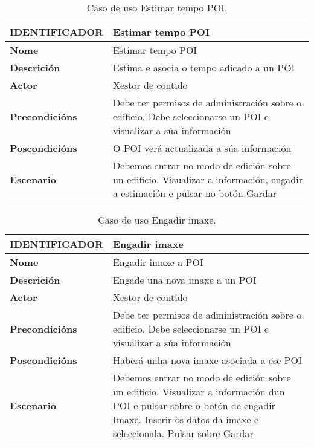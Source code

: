 \begin{table}[tbh]
	\footnotesize
	\centering
	\begin{tabular}{|l|p{10cm}|}
		\hline 
		\textbf{IDENTIFICADOR}	& \textbf{Estimar tempo POI} \\ 
		\hline 
		\textbf{Nome} & Estimar tempo POI \\ 
		\hline 
		\textbf{Descrición} & Estima e asocia o tempo adicado a un POI \\ 
		\hline 
		\textbf{Actor} & Xestor de contido \\ 
		\hline 
		\textbf{Precondicións} & Debe ter permisos de administración sobre o edificio. Debe seleccionarse un POI e visualizar a súa información \\ 
		\hline 
		\textbf{Poscondicións} & O POI verá actualizada a súa información \\ 
		\hline 
		\textbf{Escenario} & Debemos entrar no modo de edición sobre un edificio. Visualizar a información, engadir a estimación e pulsar no botón Gardar \\ 
		\hline 
	\end{tabular}
	\caption{Caso de uso Estimar tempo POI.}
	\label{tab:cuEstimarTempoPOI}
\end{table}

\begin{table}[tbh]
	\footnotesize
	\centering
	\begin{tabular}{|l|p{10cm}|}
		\hline 
		\textbf{IDENTIFICADOR}	& \textbf{Engadir imaxe} \\ 
		\hline 
		\textbf{Nome} & Engadir imaxe a POI \\ 
		\hline 
		\textbf{Descrición} & Engade una nova imaxe a un POI \\ 
		\hline 
		\textbf{Actor} & Xestor de contido \\ 
		\hline 
		\textbf{Precondicións} & Debe ter permisos de administración sobre o edificio. Debe seleccionarse un POI e visualizar a súa información \\ 
		\hline 
		\textbf{Poscondicións} & Haberá unha nova imaxe asociada a ese POI \\ 
		\hline 
		\textbf{Escenario} & Debemos entrar no modo de edición sobre un edificio. Visualizar a información dun POI e pulsar sobre o botón de engadir Imaxe. Inserir os datos da imaxe e seleccionala. Pulsar sobre Gardar \\ 
		\hline 
	\end{tabular}
	\caption{Caso de uso Engadir imaxe.}
	\label{tab:cuEngadirImaxe}
\end{table}

